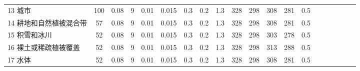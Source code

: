 \begin{landscape}
\begin{table}[htbp]
\begin{tabular}{@{}lccccccccccccccccccc@{}}
      13 城市                 & 100                  & 0.08     & 9   & 0.01 & 0.015               & 0.3   & 0.2   & 1.3   & 328               & 298               & 308                 & 281                & 0.5                \\
      14 耕地和自然植被混合带 & 57                   & 0.08     & 9   & 0.01 & 0.015               & 0.3   & 0.2   & 1.3   & 328               & 298               & 308                 & 281                & 0.5                \\
      15 积雪和冰川           & 52                   & 0.08     & 9   & 0.01 & 0.015               & 0.3   & 0.2   & 1.3   & 328               & 298               & 303                 & 278                & 0.5                \\
      16 裸土或稀疏植被覆盖   & 52                   & 0.08     & 9   & 0.01 & 0.015               & 0.3   & 0.2   & 1.3   & 328               & 298               & 313                 & 288                & 0.5                \\
      17 水体                 & 52                   & 0.08     & 9   & 0.01 & 0.015               & 0.3   & 0.2   & 1.3   & 328               & 298               & 308                 & 281                & 0.5                \\ \bottomrule
    \end{tabular}
  \end{table}
\end{landscape}



